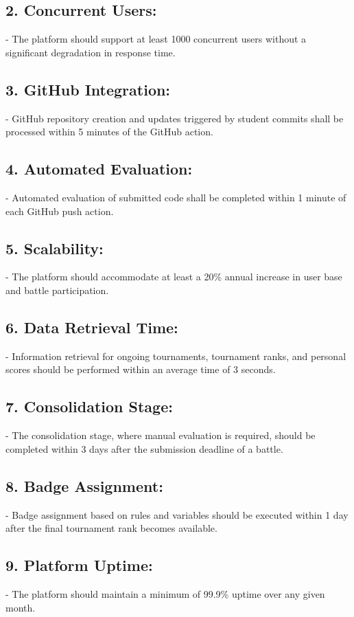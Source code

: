 \subsection*{2. Concurrent Users:}
   - The platform should support at least 1000 concurrent users without a significant degradation in response time.

\subsection*{3. GitHub Integration:}
   - GitHub repository creation and updates triggered by student commits shall be processed within 5 minutes of the GitHub action.

\subsection*{4. Automated Evaluation:}
   - Automated evaluation of submitted code shall be completed within 1 minute of each GitHub push action.

\subsection*{5. Scalability:}
   - The platform should accommodate at least a 20\% annual increase in user base and battle participation.

\subsection*{6. Data Retrieval Time:}
   - Information retrieval for ongoing tournaments, tournament ranks, and personal scores should be performed within an average time of 3 seconds.

\subsection*{7. Consolidation Stage:}
   - The consolidation stage, where manual evaluation is required, should be completed within 3 days after the submission deadline of a battle.

\subsection*{8. Badge Assignment:}
   - Badge assignment based on rules and variables should be executed within 1 day after the final tournament rank becomes available.

\subsection*{9. Platform Uptime:}
   - The platform should maintain a minimum of 99.9\% uptime over any given month.


